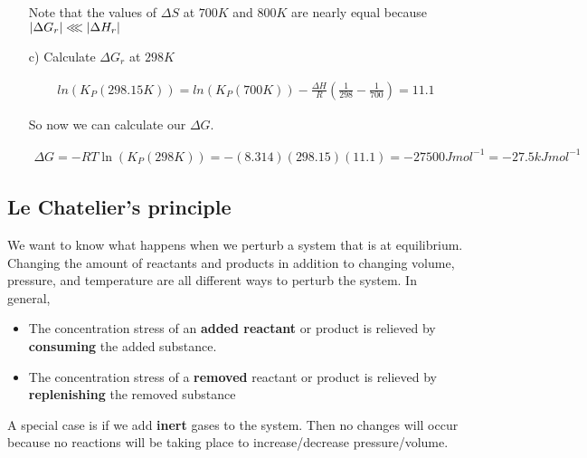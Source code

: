 \documentclass[12pt]{book}
\begin{document}
\begin{itemize}
    Note that the values of $\Delta S$ at $700K$ and $800K$ are nearly equal because $|\Delta G_r|\llless|\Delta H_r|$

    \item[c)] Calculate $\Delta G_r$ at $298K$

    \begin{align*}
        ln(K_P(298.15K))=ln(K_P(700K))-\frac{\Delta H}{R}\left(\frac{1}{298}-\frac{1}{700}\right)=11.1
    \end{align*}

    So now we can calculate our $\Delta G$.
    
    \begin{align*}
        \Delta G=-RT\ln(K_P(298K))=-(8.314)(298.15)(11.1)=-27500Jmol^{-1}=-27.5kJmol^{-1}
    \end{align*}
\end{itemize}

\subsection*{Le Chatelier's principle}

We want to know what happens when we perturb a system that is at equilibrium. Changing the amount of reactants and products in addition to changing volume, pressure, and temperature are all different ways to perturb the system. In general, 

\begin{itemize}
    \item The concentration stress of an \textbf{added reactant} or product is relieved by \textbf{consuming} the added substance.
    \item The concentration stress of a \textbf{removed} reactant or product is relieved by \textbf{replenishing} the removed substance
\end{itemize}

A special case is if we add \textbf{inert} gases to the system. Then no changes will occur because no reactions will be taking place to increase/decrease pressure/volume.
\end{document}
